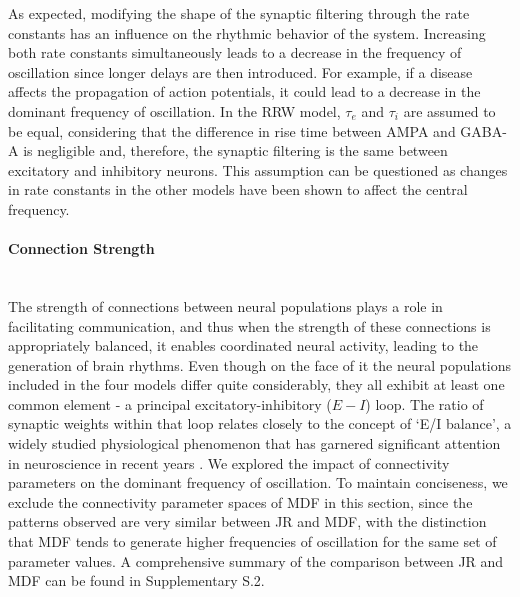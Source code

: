 \documentclass[12pt,twoside]{article}
\begin{document}
As expected, modifying the shape of the synaptic filtering through the rate constants has an influence on the rhythmic behavior of the system. Increasing both rate constants simultaneously leads to a decrease in the frequency of oscillation since longer delays are then introduced. For example, if a disease affects the propagation of action potentials, it could lead to a decrease in the dominant frequency of oscillation.
In the RRW model, $\tau_{e}$ and $\tau_{i}$ are assumed to be equal, considering that the difference in rise time between AMPA and GABA-A is negligible and, therefore, the synaptic filtering is the same between excitatory and inhibitory neurons. This assumption can be questioned as changes in rate constants in the other models have been shown to affect the central frequency. 



\paragraph{Connection Strength} ~\\
The strength of connections between neural populations plays a role in facilitating communication, and thus when the strength of these connections is appropriately balanced, it enables coordinated neural activity, leading to the generation of brain rhythms. Even though on the face of it the neural populations included in the four models differ quite considerably, they all exhibit at least one common element - a principal excitatory-inhibitory ($E - I$) loop. The ratio of synaptic weights within that loop relates closely to the concept of `E/I balance', a widely studied physiological phenomenon that has garnered significant attention in neuroscience in recent years \citep{meisel2017decline, zhou2018synaptic, sohal2019excitation, murray2014linking}. We explored the impact of connectivity parameters on the dominant frequency of oscillation. To maintain conciseness, we exclude the connectivity parameter spaces of MDF in this section, since the patterns observed are very similar between JR and MDF, with the distinction that MDF tends to generate higher frequencies of oscillation for the same set of parameter values. A comprehensive summary of the comparison between JR and MDF can be found in Supplementary S.2.
\end{document}
